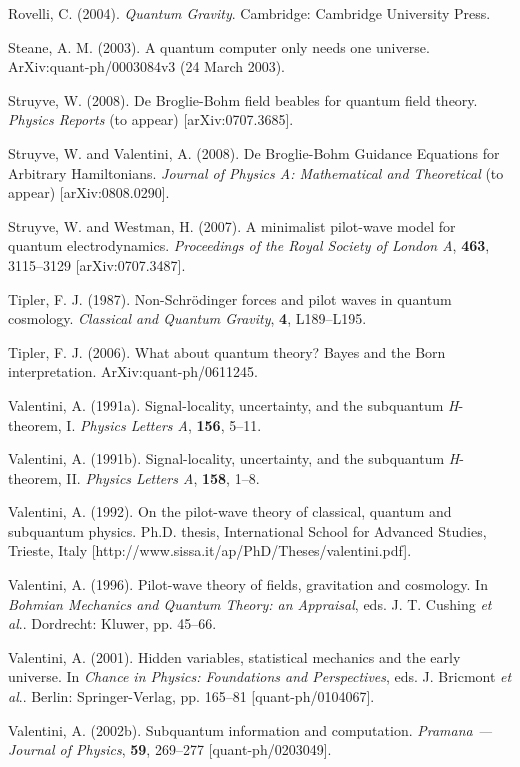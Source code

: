\documentclass{article}%
\begin{document}
Rovelli, C. (2004). \textit{Quantum Gravity}. Cambridge: Cambridge University Press.

Steane, A. M. (2003). A quantum computer only needs one universe.
ArXiv:quant-ph/0003084v3 (24 March 2003).

Struyve, W. (2008). De Broglie-Bohm field beables for quantum field theory.
\textit{Physics Reports} (to appear) [arXiv:0707.3685].

Struyve, W. and Valentini, A. (2008). De Broglie-Bohm Guidance Equations for
Arbitrary Hamiltonians. \textit{Journal of Physics A: Mathematical and
Theoretical} (to appear) [arXiv:0808.0290].

Struyve, W. and Westman, H. (2007). A minimalist pilot-wave model for quantum
electrodynamics. \textit{Proceedings of the Royal Society of London A},
\textbf{463}, 3115--3129 [arXiv:0707.3487].

Tipler, F. J. (1987). Non-Schr\"{o}dinger forces and pilot waves in quantum
cosmology. \textit{Classical and Quantum Gravity}, \textbf{4}, L189--L195.

Tipler, F. J. (2006). What about quantum theory? Bayes and the Born
interpretation. ArXiv:quant-ph/0611245.

Valentini, A. (1991a). Signal-locality, uncertainty, and the subquantum
\textit{H}-theorem, I. \textit{Physics Letters A}, \textbf{156}, 5--11.

Valentini, A. (1991b). Signal-locality, uncertainty, and the subquantum
\textit{H}-theorem, II. \textit{Physics Letters A}, \textbf{158}, 1--8.

Valentini, A. (1992). On the pilot-wave theory of classical, quantum and
subquantum physics. Ph.D. thesis, International School for Advanced Studies,
Trieste, Italy [http://www.sissa.it/ap/PhD/Theses/valentini.pdf].

Valentini, A. (1996). Pilot-wave theory of fields, gravitation and cosmology.
In \textit{Bohmian Mechanics and Quantum Theory: an Appraisal}, eds. J. T.
Cushing \textit{et al}.. Dordrecht: Kluwer, pp. 45--66.

Valentini, A. (2001). Hidden variables, statistical mechanics and the early
universe. In \textit{Chance in Physics: Foundations and Perspectives}, eds. J.
Bricmont \textit{et al}.. Berlin: Springer-Verlag, pp. 165--81 [quant-ph/0104067].

Valentini, A. (2002b). Subquantum information and computation. \textit{Pramana
--- Journal of Physics}, \textbf{59}, 269--277 [quant-ph/0203049].
\end{document}
